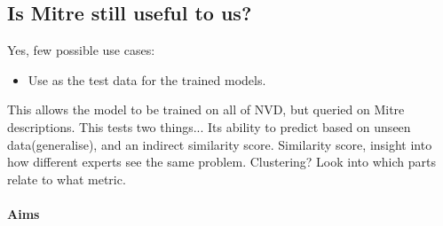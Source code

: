 \documentclass[11pt]{article}
\begin{document}
\subsection{Is Mitre still useful to us?}

Yes, few possible use cases:

\begin{itemize}
	\item Use as the test data for the trained models.
\end{itemize}

This allows the model to be trained on all of NVD, but queried on Mitre descriptions. This tests two
things... Its ability to predict based on unseen data(generalise), and an indirect similarity score.
Similarity score, insight into how different experts see the same problem.
Clustering? Look into which parts relate to what metric.



\paragraph{Aims}
\noindent
\end{document}
